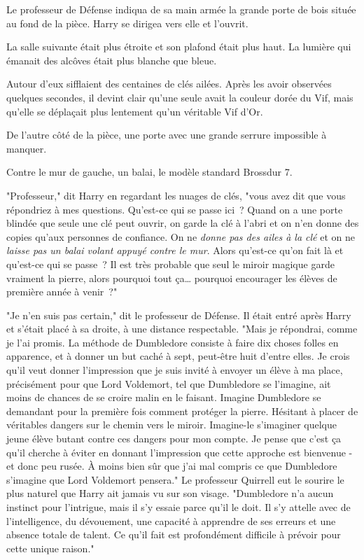 Le professeur de Défense indiqua de sa main armée la grande porte de bois située au fond de la pièce. Harry se dirigea vers elle et l'ouvrit.

\later

La salle suivante était plus étroite et son plafond était plus haut. La lumière qui émanait des alcôves était plus blanche que bleue.

Autour d'eux sifflaient des centaines de clés ailées. Après les avoir observées quelques secondes, il devint clair qu'une seule avait la couleur dorée du Vif, mais qu'elle se déplaçait plus lentement qu'un véritable Vif d'Or.

De l'autre côté de la pièce, une porte avec une grande serrure impossible à manquer.

Contre le mur de gauche, un balai, le modèle standard Brossdur 7.

"Professeur," dit Harry en regardant les nuages de clés, "vous avez dit que vous répondriez à mes questions. Qu'est-ce qui se passe ici~? Quand on a une porte blindée que seule une clé peut ouvrir, on garde la clé à l'abri et on n'en donne des copies qu'aux personnes de confiance. On ne \emph{donne pas des ailes à la clé} et on ne \emph{laisse pas un balai volant appuyé contre le mur}. Alors qu'est-ce qu'on fait là et qu'est-ce qui se passe~? Il est très probable que seul le miroir magique garde vraiment la pierre, alors pourquoi tout ça… pourquoi encourager les élèves de première année à venir~?"

"Je n'en suis pas certain," dit le professeur de Défense. Il était entré après Harry et s'était placé à sa droite, à une distance respectable. "Mais je répondrai, comme je l'ai promis. La méthode de Dumbledore consiste à faire dix choses folles en apparence, et à donner un but caché à sept, peut-être huit d'entre elles. Je crois qu'il veut donner l'impression que je suis invité à envoyer un élève à ma place, précisément pour que Lord Voldemort, tel que Dumbledore se l'imagine, ait moins de chances de se croire malin en le faisant. Imagine Dumbledore se demandant pour la première fois comment protéger la pierre. Hésitant à placer de véritables dangers sur le chemin vers le miroir. Imagine-le s'imaginer quelque jeune élève butant contre ces dangers pour mon compte. Je pense que c'est ça qu'il cherche à éviter en donnant l'impression que cette approche est bienvenue - et donc peu rusée. À moins bien sûr que j'ai mal compris ce que Dumbledore s'imagine que Lord Voldemort pensera." Le professeur Quirrell eut le sourire le plus naturel que Harry ait jamais vu sur son visage. "Dumbledore n'a aucun instinct pour l'intrigue, mais il s'y essaie parce qu'il le doit. Il s'y attelle avec de l'intelligence, du dévouement, une capacité à apprendre de ses erreurs et une absence totale de talent. Ce qu'il fait est profondément difficile à prévoir pour cette unique raison."

